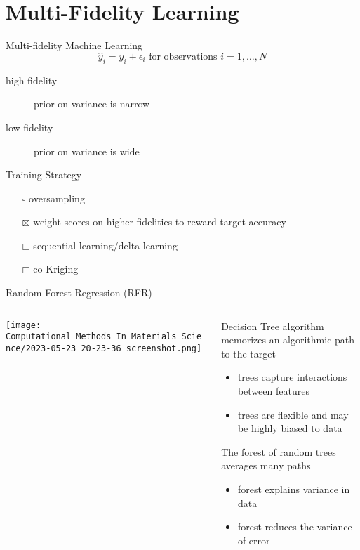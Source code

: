 \documentclass[10pt, aspectratio=169, presentation]{beamer}
\begin{document}
\section{Multi-Fidelity Learning}
\label{sec:orgbf8bf45}
\begin{frame}[label={sec:orgf869438}]{Multi-fidelity Machine Learning}
\[
\hat{y}_i = y_i + \epsilon_i \mbox{ for observations } i=1,…,N
\]

\begin{description}
\item[{high fidelity}] prior on variance is narrow
\item[{low fidelity}] prior on variance is wide
\end{description}

\begin{block}{Training Strategy}
\begin{itemize}
\item[{$\square$}] oversampling
\item[{$\boxtimes$}] weight scores on higher fidelities to reward target accuracy
\item[{$\boxminus$}] sequential learning/delta learning
\item[{$\boxminus$}] co-Kriging
\end{itemize}
\end{block}
\end{frame}
\begin{frame}[label={sec:org3286982}]{Random Forest Regression (RFR)}
\begin{columns}
\begin{column}{0.6\columnwidth}
\begin{center}
\texttt{[image: Computational\_Methods\_In\_Materials\_Science/2023-05-23\_20-23-36\_screenshot.png]}
\end{center}
\end{column}

\begin{column}{0.4\columnwidth}
Decision Tree algorithm memorizes an algorithmic path to the target
\begin{itemize}
\item trees capture interactions between features
\item trees are flexible and may be highly biased to data
\end{itemize}
The forest of random trees averages many paths
\begin{itemize}
\item forest explains variance in data
\item forest reduces the variance of error
\end{itemize}
\end{column}
\end{columns}
\end{frame}
\end{document}
